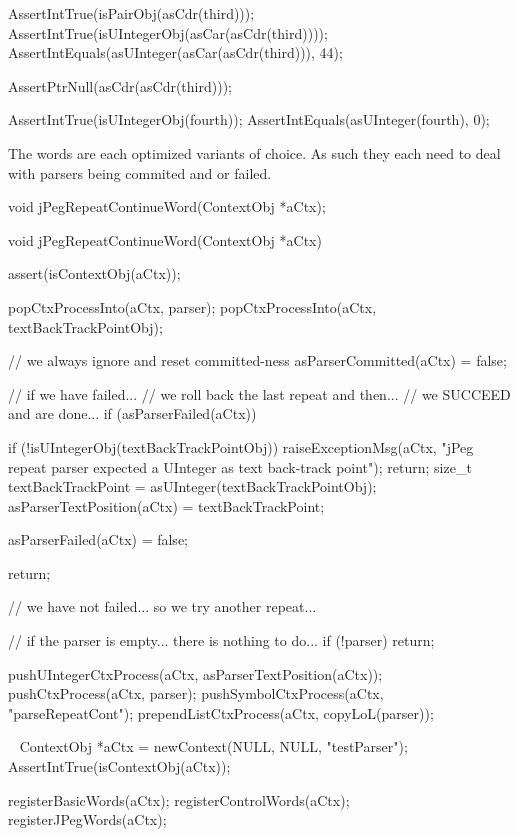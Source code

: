   AssertIntTrue(isPairObj(asCdr(third)));
  AssertIntTrue(isUIntegerObj(asCar(asCdr(third))));
  AssertIntEquals(asUInteger(asCar(asCdr(third))), 44);
  
  AssertPtrNull(asCdr(asCdr(third)));
  
  AssertIntTrue(isUIntegerObj(fourth));
  AssertIntEquals(asUInteger(fourth), 0);
\stopCTest
\stopTestCase
\stopTestSuite

The  words are each optimized variants of 
choice. As such they each need to deal with parsers being commited and or 
failed. 

\startTestSuite[jPegRepeatContinueWord]

\startCHeader
void jPegRepeatContinueWord(ContextObj *aCtx);
\stopCHeader

\startCCode
void jPegRepeatContinueWord(ContextObj *aCtx) {
  assert(isContextObj(aCtx));
  
  popCtxProcessInto(aCtx, parser);
  popCtxProcessInto(aCtx, textBackTrackPointObj);
  
  // we always ignore and reset committed-ness
  asParserCommitted(aCtx) = false;

  // if we have failed...
  // we roll back the last repeat and then...
  // we SUCCEED and are done...
  if (asParserFailed(aCtx)) {
  
    if (!isUIntegerObj(textBackTrackPointObj)) {
      raiseExceptionMsg(aCtx,
        "jPeg repeat parser expected a UInteger as text back-track point");
      return;
    }
    size_t textBackTrackPoint = asUInteger(textBackTrackPointObj);
    asParserTextPosition(aCtx) = textBackTrackPoint;
    
    asParserFailed(aCtx) = false;
    
    return;
  }
  
  // we have not failed... so we try another repeat...
  
  // if the parser is empty... there is nothing to do...
  if (!parser) return;

  pushUIntegerCtxProcess(aCtx, asParserTextPosition(aCtx));
  pushCtxProcess(aCtx, parser);
  pushSymbolCtxProcess(aCtx, "parseRepeatCont");
  prependListCtxProcess(aCtx, copyLoL(parser));
}
\stopCCode

\CTestsSuiteSetup\
\startCTest
  ContextObj *aCtx = newContext(NULL, NULL, "testParser");
  AssertIntTrue(isContextObj(aCtx));
  
  registerBasicWords(aCtx);
  registerControlWords(aCtx);
  registerJPegWords(aCtx);
  
